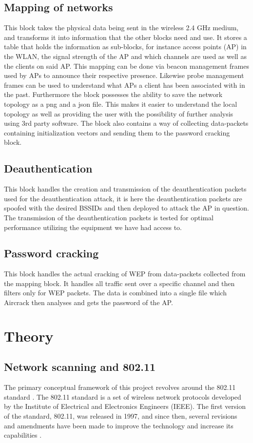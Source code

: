 \subsection{Mapping of networks}
This block takes the physical data being sent in the wireless 2.4 GHz medium, and transforms it into information that the other blocks need and use. It stores a table that holds the information as sub-blocks, for instance access points (AP) in the WLAN, the signal strength of the AP and which channels are used as well as the clients on said AP. This mapping can be done via beacon management frames used by APs to announce their respective presence. Likewise probe management frames can be used to understand what APs a client has been associated with in the past.
Furthermore the block possesses the ability to save the network topology as a png and a json file. This makes it easier to understand the local topology as well as providing the user with the possibility of further analysis using 3rd party software.
The block also contains a way of collecting data-packets containing initialization vectors and sending them to the password cracking block. 


\subsection{Deauthentication}
This block handles the creation and transmission of the deauthentication packets used for the deauthentication attack, it is here the deauthentication packets are spoofed with the desired BSSIDs and then deployed to attack the AP in question. The transmission of the deauthentication packets is tested for optimal performance utilizing the equipment we have had access to. 

\subsection{Password cracking}
This block handles the actual cracking of WEP from data-packets collected from the mapping block. It handles all traffic sent over a specific channel and then filters only for WEP packets. The data is combined into a single file which Aircrack then analyses and gets the password of the AP.

\section{Theory}

\subsection{Network scanning and 802.11}
The primary conceptual framework of this project revolves around the 802.11 standard \cite{IEEE802.11}. The 802.11 standard is a set of wireless network protocols developed by the Institute of Electrical and Electronics Engineers (IEEE). The first version of the standard, 802.11, was released in 1997, and since then, several revisions and amendments have been made to improve the technology and increase its capabilities \cite{ETHW}.

